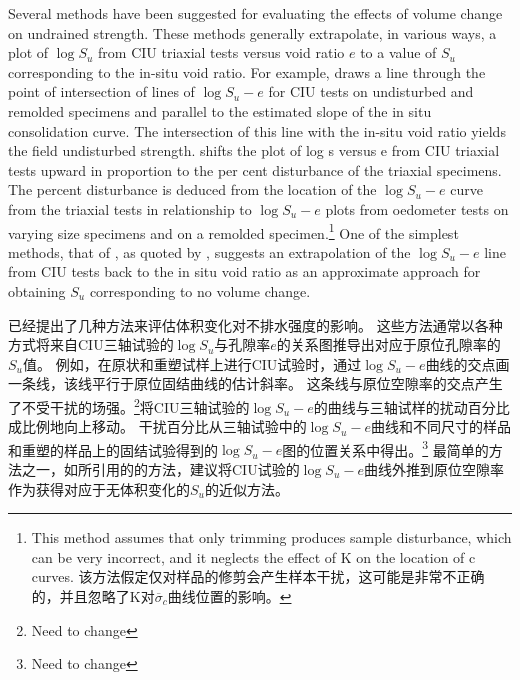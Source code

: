 \begin{paracol}{2}
    
    Several methods have been suggested for evaluating the effects of volume change on undrained strength. These methods generally extrapolate, in various ways, a plot of $\log{}S_u$ from CIU triaxial tests versus void ratio $e$ to a value of $S_u$ corresponding to the in-situ void ratio. For example, \citet{Schmertmann1956940} draws a line through the point of intersection of lines of $\log{}S_u-e$ for CIU tests on undisturbed and remolded specimens and parallel to the estimated slope of the in situ consolidation curve. The intersection of this line with the in-situ void ratio yields the field undisturbed strength. \citet{Calhoon1956925} shifts the plot of log s versus e from CIU triaxial tests upward in proportion to the per cent disturbance of the triaxial specimens. The percent disturbance is deduced from the location of the $\log{}S_u-e$ curve from the triaxial tests in relationship to $\log{}S_u-e$ plots from oedometer tests on varying size specimens and on a remolded specimen.\footnote{
        This method assumes that only trimming produces sample disturbance, which can be very incorrect, and it neglects the effect of K on the location of c curves. 该方法假定仅对样品的修剪会产生样本干扰，这可能是非常不正确的，并且忽略了K对$\overline{\sigma}_c$曲线位置的影响。} 
    One of the simplest methods, that of \citet{Casagrande1947}, as quoted by \citet{Hvorslev1949}, suggests an extrapolation of the $\log{}S_u-e$ line from CIU tests back to the in situ void ratio as an approximate approach for obtaining $S_u$ corresponding to no volume change.

    \switchcolumn

    已经提出了几种方法来评估体积变化对不排水强度的影响。 这些方法通常以各种方式将来自CIU三轴试验的$\log{}S_u$与孔隙率$e$的关系图推导出对应于原位孔隙率的$S_u$值。 例如，\citet{Schmertmann1956940}在原状和重塑试样上进行CIU试验时，通过$\log{}S_u-e$曲线的交点画一条线，该线平行于原位固结曲线的估计斜率。 这条线与原位空隙率的交点产生了不受干扰的场强。\footnote{Need to change}\citet{Calhoon1956925}将CIU三轴试验的$\log{}S_u-e$的曲线与三轴试样的扰动百分比成比例地向上移动。 干扰百分比从三轴试验中的$\log{}S_u-e$曲线和不同尺寸的样品和重塑的样品上的固结试验得到的$\log{}S_u-e$图的位置关系中得出。\footnote{Need to change} 最简单的方法之一，如\citet{Hvorslev1949}所引用的\citet{Casagrande1947}的方法，建议将CIU试验的$\log{}S_u-e$曲线外推到原位空隙率作为获得对应于无体积变化的$S_u$的近似方法。

    \switchcolumn*


\end{paracol}
